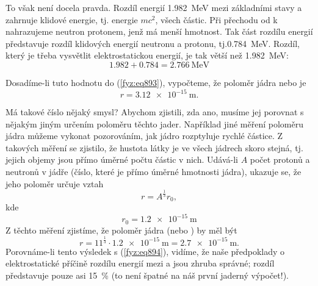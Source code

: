     To však není docela pravda. Rozdíl energií \SI{1.982}{\mega\electronvolt} mezi základními stavy
     a  zahr­nuje klidové energie, tj. energie \(mc^2\), všech částic. Při
    přechodu od  k  nahrazujeme neutron protonem, jenž má menší hmotnost. Tak část
    rozdílu energií představuje rozdíl klidových energií neutronu a protonu,
    tj.\SI{0.784}{\mega\electronvolt}. Rozdíl, který je třeba vysvětlit elektrostatickou energií, je
    tak větší než \SI{1.982}{\mega\electronvolt}:
    \begin{equation*}
      \num{1.982} + \num{0.784} = \SI{2.766}{\mega\electronvolt}
    \end{equation*}

    Dosadíme-li tuto hodnotu do (\ref{fyz:eq893}), vypočteme, že poloměr jádra  nebo
     je
    \begin{equation}\label{fyz:eq894}
      r = \SI{3.12e-15}{\m}.
    \end{equation}

    Má takové číslo nějaký smysl? Abychom zjistili, zda ano, musíme jej porovnat s nějakým jiným
    určením poloměru těchto jader. Například jiné měření poloměru jádra můžeme vykonat pozorováním,
    jak jádro rozptyluje rychlé částice. Z takových měření se zjistilo, že hustota látky je ve všech
    jádrech skoro stejná, tj. jejich objemy jsou přímo úměrné počtu částic v nich. Udává-li \(A\)
    počet protonů a neutronů v jádře (číslo, které je přímo úměrné hmotnosti jádra), ukazuje se, že
    jeho poloměr určuje vztah
    \begin{equation}\label{fyz:eq895}
      r=A^{\frac{1}{3}}r_0,
    \end{equation}
    kde
    \begin{equation}\label{fyz:eq896}
      r_0=\SI{1.2e-15}{\m}
    \end{equation}
    Z těchto měření zjistíme, že poloměr jádra  (nebo ) by měl být
    \begin{equation*}
      r=11^\frac{1}{3}\cdot\SI{1.2e-15}{\m} = \SI{2.7e-15}{\m}.
    \end{equation*}
    Porovnáme-li tento výsledek s (\ref{fyz:eq894}), vidíme, že naše předpoklady o elektrostatické
    příčině rozdílu energií mezi  a  jsou zhruba správné; rozdíl představuje pouze
    asi \SI{15}{\percent} (to není špatné na náš první jaderný výpočet!).

